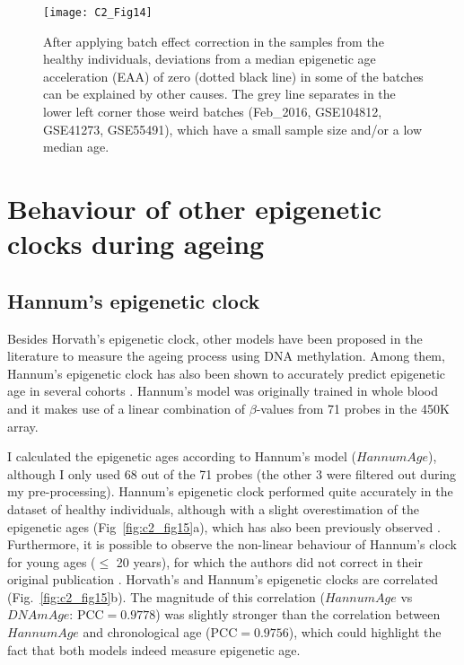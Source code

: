 \begin{figure}[htbp!] 
	\centering
	\texttt{[image: C2\_Fig14]}
	\vspace*{2mm}    
	\caption[Causes of deviation from the expected EAA distribution in the control model]{After applying batch effect correction in the samples from the healthy individuals, deviations from a median epigenetic age acceleration (EAA) of zero (dotted black line) in some of the batches can be explained by other causes. The grey line separates in the lower left corner those weird batches (Feb\_2016, GSE104812, GSE41273, GSE55491), which have a small sample size and/or a low median age.}
	\label{fig:c2_fig14}
\end{figure}


\section{Behaviour of other epigenetic clocks during ageing}

\smallskip

\subsection{Hannum's epigenetic clock}

Besides Horvath's epigenetic clock, other models have been proposed in the literature to measure the ageing process using DNA methylation. Among them, Hannum's epigenetic clock has also been shown to accurately predict epigenetic age in several cohorts \cite{Horvath2016,Chen2016,Marioni2018,Marioni2015,Perna2016,Irvin2018}. Hannum's model was originally trained in whole blood and it makes use of a linear combination of $\beta$-values from 71 probes in the 450K array. 

\bigskip

I calculated the epigenetic ages according to Hannum's model ($HannumAge$), although I only used 68 out of the 71 probes (the other 3 were filtered out during my pre-processing). Hannum's epigenetic clock performed quite accurately in the dataset of healthy individuals, although with a slight overestimation of the epigenetic ages (Fig~\ref{fig:c2_fig15}a), which has also been previously observed \cite{Marioni2015}. Furthermore, it is possible to observe the non-linear behaviour of Hannum's clock for young ages ($\leq$ 20 years), for which the authors did not correct in their original publication \cite{Hannum2013}. Horvath's and Hannum's epigenetic clocks are correlated (Fig.~\ref{fig:c2_fig15}b). The magnitude of this correlation ($HannumAge$ vs $DNAmAge$: $\text{PCC} = 0.9778$) was slightly stronger than the correlation between $HannumAge$ and chronological age ($\text{PCC} = 0.9756$), which could highlight the fact that both models indeed  measure epigenetic age.

